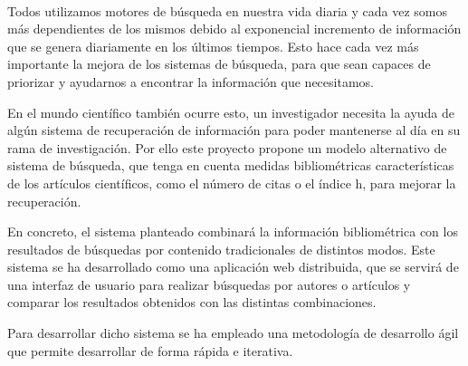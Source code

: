 \chapter*{}


%



\cleardoublepage
\thispagestyle{empty}

\begin{center}
{\large\bfseries \myTitle}\\
\end{center}
\begin{center}
\myName\\
\end{center}

\\

\vspace{0.7cm}
\\

Todos utilizamos motores de búsqueda en nuestra vida diaria y cada vez somos más dependientes de los mismos debido al exponencial incremento de información que se genera diariamente en los últimos tiempos. Esto hace cada vez más importante la mejora de los sistemas de búsqueda, para que sean capaces de priorizar y ayudarnos a encontrar la información que necesitamos.

En el mundo científico también ocurre esto, un investigador necesita la ayuda de algún sistema de recuperación de información para poder mantenerse al día en su rama de investigación. Por ello este proyecto propone un modelo alternativo de sistema de búsqueda, que tenga en cuenta medidas bibliométricas características de los artículos científicos, como el número de citas o el índice h, para mejorar la recuperación.

En concreto, el sistema planteado combinará la información bibliométrica con los resultados de búsquedas por contenido tradicionales de distintos modos. Este sistema se ha desarrollado como una aplicación web distribuida, que se servirá de una interfaz de usuario para realizar búsquedas por autores o artículos y comparar los resultados obtenidos con las distintas combinaciones.

Para desarrollar dicho sistema se ha empleado una metodología de desarrollo ágil que permite desarrollar de forma rápida e iterativa.


